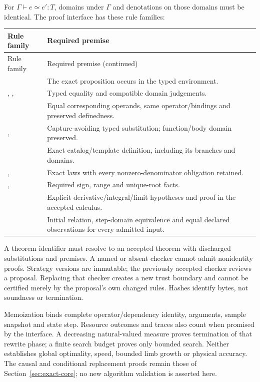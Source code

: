 For $\Gamma\vdash e\simeq e':T$, domains under $\Gamma$ and denotations on
those domains must be identical. The proof interface has these rule families:
{\small
\begin{longtable}{@{}P{.31\linewidth}P{.64\linewidth}@{}}
\toprule Rule family & Required premise\\\midrule\endfirsthead
\toprule Rule family & Required premise (continued)\\\midrule\endhead
\bottomrule\endfoot
{} & The exact proposition occurs in the typed environment.\\
, ,  & Typed equality and compatible domain judgements.\\
 & Equal corresponding operands, same operator/bindings and preserved definedness.\\
,  & Capture-avoiding typed substitution; function/body domain preserved.\\
 & Exact catalog/template definition, including its branches and domains.\\
,  & Exact laws with every nonzero-denominator obligation retained.\\
,  & Required sign, range and unique-root facts.\\
 & Explicit derivative/integral/limit hypotheses and proof in the accepted calculus.\\
 & Initial relation, step-domain equivalence and equal declared observations for every admitted input.\\
\end{longtable}}
A theorem identifier must resolve to an accepted theorem with discharged
substitutions and premises. A named or absent checker cannot admit nonidentity
proofs. Strategy versions are immutable; the previously accepted checker reviews
a proposal. Replacing that checker creates a new trust boundary and cannot be
certified merely by the proposal's own changed rules. Hashes identify bytes,
not soundness or termination.

Memoization binds complete operator/dependency identity, arguments, sample
snapshot and state step. Resource outcomes and traces also count when promised
by the interface. A decreasing natural-valued measure proves termination of
that rewrite phase; a finite search budget proves only bounded search. Neither
establishes global optimality, speed, bounded limb growth or physical accuracy.
The causal and conditional replacement proofs remain those of
Section~\ref{sec:exact-core}; no new algorithm validation is asserted here.
\endgroup
